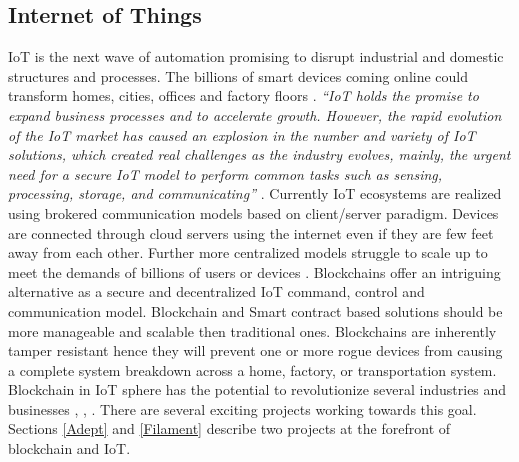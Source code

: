 \subsection{Internet of Things}
IoT is the next wave of automation promising to disrupt industrial and domestic structures and processes. The billions of smart devices coming online could transform homes, cities, offices and factory floors \cite{misc:008}. \textit{“IoT holds the promise to expand business processes and to accelerate growth. However, the rapid evolution of the IoT market has caused an explosion in the number and variety of IoT solutions, which created real challenges as the industry evolves, mainly, the urgent need for a secure IoT model to perform common tasks such as sensing, processing, storage, and communicating”} \cite{misc:002}. Currently IoT ecosystems are realized using brokered communication models based on client/server paradigm. Devices are connected through cloud servers using the internet even if they are few feet away from each other. Further more centralized models struggle to scale up to meet the demands of billions of users or devices \cite{misc:004}. Blockchains offer an intriguing alternative as a secure and decentralized IoT command, control and communication model. Blockchain and Smart contract based solutions should be more manageable and scalable then traditional ones. Blockchains are inherently tamper resistant hence they will prevent one or more rogue devices from causing a complete system breakdown across a home, factory, or transportation system. Blockchain in IoT sphere has the potential to revolutionize several industries and businesses \cite{misc:008}, \cite{misc:004}, \cite{misc:002}. There are several exciting projects working towards this goal. Sections \ref{Adept} and \ref{Filament} describe two projects at the forefront of blockchain and IoT.



\vspace{0.5cm}  
